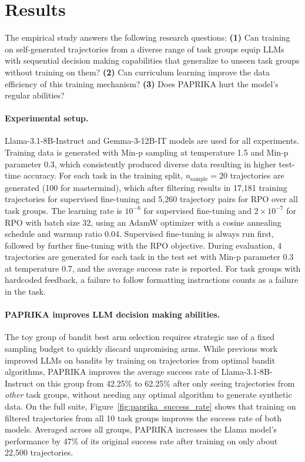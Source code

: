 \documentclass[manuscript,review]{acmart}
\begin{document}
\section{Results}
{
The empirical study answers the following research questions: \textbf{(1)} Can training
on self-generated trajectories from a diverse range of task groups equip LLMs with
sequential decision making capabilities that generalize to unseen task groups without
training on them? \textbf{(2)} Can curriculum learning improve the data efficiency of
this training mechanism? \textbf{(3)} Does \textsc{PAPRIKA} hurt the model's regular
abilities?

\paragraph{Experimental setup.}{
Llama-3.1-8B-Instruct\cite{grattafiori2024llama3herdmodels} and
Gemma-3-12B-IT\cite{gemmateam2025gemma3technicalreport} models are used for all
experiments. Training data is generated with Min-p sampling at temperature 1.5 and Min-p
parameter 0.3, which consistently produced diverse data resulting in higher test-time
accuracy. For each task in the training split, $n_\text{sample} = 20$ trajectories are
generated (100 for mastermind), which after filtering results in 17,181 training
trajectories for supervised fine-tuning and 5,260 trajectory pairs for RPO over all task
groups. The learning rate is $10^{-6}$ for supervised fine-tuning and $2 \times 10^{-7}$
for RPO with batch size 32, using an AdamW
optimizer\cite{loshchilov2019decoupledweightdecayregularization} with a cosine annealing
schedule and warmup ratio 0.04\cite{loshchilov2017sgdrstochasticgradientdescent}.
Supervised fine-tuning is always run first, followed by further fine-tuning with the RPO
objective. During evaluation, 4 trajectories are generated for each task in the test set
with Min-p parameter 0.3 at temperature 0.7, and the average success rate is reported.
For task groups with hardcoded feedback, a failure to follow formatting instructions
counts as a failure in the task.
}

\paragraph{\textsc{PAPRIKA} improves LLM decision making abilities.}{
The toy group of bandit best arm selection requires strategic use of a fixed sampling
budget to quickly discard unpromising arms. While previous work improved LLMs on bandits
by training on trajectories from optimal bandit algorithms, \textsc{PAPRIKA} improves
the average success rate of Llama-3.1-8B-Instruct on this group from 42.25\% to 62.25\%
after only seeing trajectories from \emph{other} task groups, without needing any optimal
algorithm to generate synthetic data. On the full suite,
Figure~\ref{fig:paprika_success_rate} shows that training on filtered trajectories from
all 10 task groups improves the success rate of both models. Averaged across all groups,
\textsc{PAPRIKA} increases the Llama model's performance by 47\% of its original success
rate after training on only about 22,500 trajectories.
}

}
\end{document}
